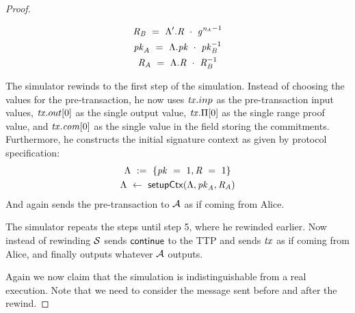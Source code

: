 \begin{proof}
\begin{asparaenum}
\begin{gather*}
            \mathit{R}_{\mathit{B}} ~=~ {\Lambda}'.\mathit{R} ~\cdot~ {\mathit{g}^{\mathit{\mathit{n}_{\mathit{A}}}}}^{-1} \\
            \mathit{pk}_{\mathit{A}} ~=~ \Lambda.\mathit{pk} ~\cdot~ \mathit{pk}_{\mathit{B}}^{-1} \\
            \mathit{R}_{\mathit{A}} ~=~ \Lambda.\mathit{R} ~\cdot~ \mathit{R}_{\mathit{B}}^{-1}
        \end{gather*}
        \item The simulator rewinds to the first step of the simulation.
        Instead of choosing the values for the pre-transaction, he now uses $\mathit{tx}.inp$ as the pre-transaction input values, $\mathit{tx}.out[0]$ as the single output value, $\mathit{tx}.\Pi[0]$ as the single range proof value, and $\mathit{tx}.\mathit{com}[0]$ as the single value in the field storing the commitments.
        Furthermore, he constructs the initial signature context as given by protocol specification:
        \begin{gather*}
            \Lambda ~:=~ \{ \mathit{pk} ~=~ 1, \mathit{R} ~=~ 1 \} \\
            \Lambda ~\leftarrow~ \mathsf{setupCtx}( \Lambda, \mathit{pk}_{\mathit{A}}, \mathit{R}_{\mathit{A}} )
        \end{gather*}
        And again sends the pre-transaction to $\mathcal{A}$ as if coming from Alice.
        \item The simulator repeats the steps until step 5, where he rewinded earlier.
        Now instead of rewinding $\mathcal{S}$ sends $\mathsf{continue}$ to the TTP and sends $\mathit{tx}$ as if coming from Alice, and finally outputs whatever $\mathcal{A}$ outputs.
    \end{asparaenum}

    Again we now claim that the simulation is indistinguishable from a real execution.
    Note that we need to consider the message sent before and after the rewind.


\end{proof}
